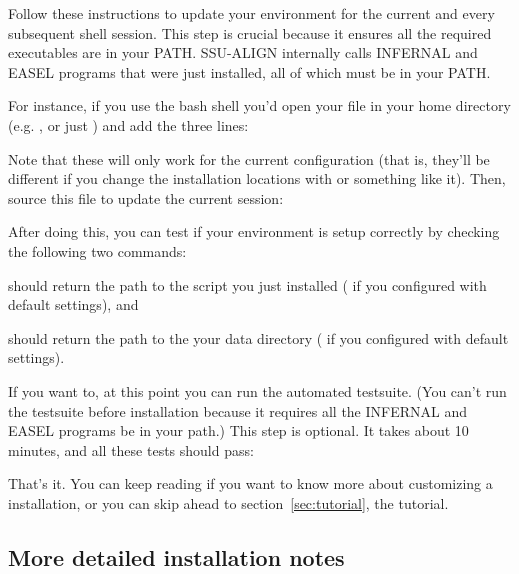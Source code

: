 Follow these instructions to update your environment for the current
and every subsequent shell session. This step is crucial because it
ensures all the required executables are in your PATH. SSU-ALIGN
internally calls INFERNAL and EASEL programs that were just installed,
all of which must be in your PATH.

For instance, if you use the bash shell you'd 
open your  file in your home directory (e.g.
, or just ) and add the
three lines: 




Note that these will only work for the current configuration (that is,
they'll be different if you change the installation locations with
 or something like it). Then, source this file to
update the current session:


After doing this, you can test if your environment is setup correctly
by checking the following two commands: 


should return the path to the  script you
just installed ( if you configured
with default settings), and


should return the path to the your data directory
( if you configured with default
settings).

If you want to, at this point you can run the automated
testsuite. (You can't run the testsuite before installation because it
requires all the INFERNAL and EASEL programs be in your path.)
This step is optional. It takes about 10 minutes, and all these
tests should pass: 


That's it. You can keep reading if you want to know more about
customizing a  installation, or you can skip ahead to
section~\ref{sec:tutorial}, the tutorial.

\subsection{More detailed installation notes}

